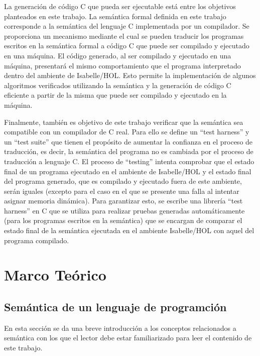 La generación de código C que pueda ser ejecutable está entre los objetivos planteados en este trabajo.
La semántica formal definida en este trabajo corresponde a la semántica del lenguaje C implementada por un compilador.
Se proporciona un mecanismo mediante el cual se pueden traducir los programas escritos en la semántica formal a código C que puede ser compilado y ejecutado en una máquina.
El código generado, al ser compilado y ejecutado en una máquina, presentará el mismo comportamiento que el programa interpretado dentro del ambiente de Isabelle/HOL.
Esto permite la implementación de algunos algoritmos verificados utilizando la semántica y la generación de código C eficiente a partir de la misma que puede ser compilado y ejecutado en la máquina.

Finalmente, también es objetivo de este trabajo verificar que la semántica sea compatible con un compilador de C real.
Para ello se define un ``test harness'' y un ``test suite'' que tienen el propósito de aumentar la confianza en el proceso de traducción, es decir, la semántica del programa no es cambiada por el proceso de traducción a lenguaje C.
El proceso de ``testing'' intenta comprobar que el estado final de un programa ejecutado en el ambiente de Isabelle/HOL y el estado final del programa generado, que es compilado y ejecutado fuera de este ambiente, serán iguales (excepto para el caso en el que se presente una falla al intentar asignar memoria dinámica).
Para garantizar esto, se escribe una librería ``test harness'' en C que se utiliza para realizar pruebas generadas automáticamente (para los programas escritos en la semántica) que se encargan de comparar el estado final de la semántica ejecutada en el ambiente Isabelle/HOL con aquel del programa compilado.


\section{Marco Teórico}
\begin{comment}
FIXME! no se si está bien este título.
\end{comment}

\subsection{Semántica de un lenguaje de programción}

En esta sección se da una breve introducción a los conceptos relacionados a semántica con los que el lector debe estar familiarizado para leer el contenido de este trabajo.

